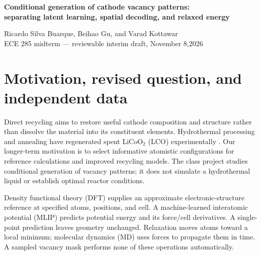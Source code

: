 \documentclass[10pt]{article}
\begin{document}
\begin{center}
{\Large\bfseries Conditional generation of cathode vacancy patterns:\\
separating latent learning, spatial decoding, and relaxed energy}\par\vspace{4 pt}
Ricardo Silva Buarque, Beihao Gu, and Varad Kottawar\\
ECE 285 midterm --- reviewable interim draft, November 8,2026
\end{center}
\begin{abstract}
We test whether a conditional variational autoencoder (CVAE) proposes new
Li/vacancy configurations at a requested composition and energy range more
efficiently than uniform sampling and mutation. Earlier spatial decoding improved
teacher-defined yield, but its latent variables were nearly unused. The present
matched controls separate a graph-posterior CVAE, a no-latent autoregressive
sampler, and a dense-posterior CVAE with the same causal spatial decoder. Nine
4,000-update fits and fresh development scoring are complete. Spatial AR matches
the graph CVAE, while a dense posterior retains information without useful
prior-generation gain. Relaxed-endpoint acquisition continues. Exhaustive small-cell
enumeration quantifies approximate symmetry and teacher disagreement. No new DFT
or interatomic-potential fine-tuning is performed, and generative, numerical, and
physical validation remain distinct.
\end{abstract}

\section{Motivation, revised question, and independent data}
Direct recycling aims to restore useful cathode composition and structure rather
than dissolve the material into its constituent elements. Hydrothermal processing
and annealing have regenerated spent LiCoO$_2$ (LCO) experimentally
\cite{shi2018}. Our longer-term motivation is to select informative atomistic
configurations for reference calculations and improved recycling models.
The class project studies conditional generation of vacancy patterns; it does not
simulate a hydrothermal liquid or establish optimal reactor conditions.

Density functional theory (DFT) supplies an approximate electronic-structure
reference at specified atoms, positions, and cell. A machine-learned interatomic
potential (MLIP) predicts potential energy and its force/cell derivatives. A
single-point prediction leaves geometry unchanged. Relaxation moves atoms toward
a local minimum; molecular dynamics (MD) uses forces to propagate them in time.
A sampled vacancy mask performs none of these operations automatically.
\end{document}
